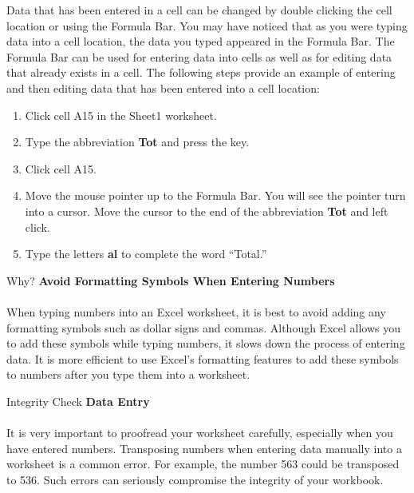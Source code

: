 Data that has been entered in a cell can be changed by double clicking the cell location or using the Formula Bar. You may have noticed that as you were typing data into a cell location, the data you typed appeared in the Formula Bar. The Formula Bar can be used for entering data into cells as well as for editing data that already exists in a cell. The following steps provide an example of entering and then editing data that has been entered into a cell location:

\begin{enumerate}
	\item Click cell \textsf{A15} in the Sheet1 worksheet.
	\item Type the abbreviation \textbf{Tot} and press the  key.
	\item Click cell \textsf{A15}.
	\item Move the mouse pointer up to the Formula Bar. You will see the pointer turn into a cursor. Move the cursor to the end of the abbreviation \textbf{Tot} and left click.
	\item Type the letters \textbf{al} to complete the word ``Total.''
\end{enumerate}

\begin{center}
	\begin{infobox}{Why?}
		\textbf{Avoid Formatting Symbols When Entering Numbers}
		\\
		\\
		When typing numbers into an Excel worksheet, it is best to avoid adding any formatting symbols such as dollar signs and commas. Although Excel allows you to add these symbols while typing numbers, it slows down the process of entering data. It is more efficient to use Excel's formatting features to add these symbols to numbers after you type them into a worksheet.
	\end{infobox}
\end{center}

\begin{center}
	\begin{infobox}{Integrity Check}
		\textbf{Data Entry}
		\\
		\\
		It is very important to proofread your worksheet carefully, especially when you have entered numbers. Transposing numbers when entering data manually into a worksheet is a common error. For example, the number 563 could be transposed to 536. Such errors can seriously compromise the integrity of your workbook.
	\end{infobox}
\end{center}


